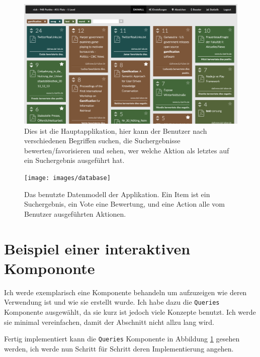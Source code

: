 \documentclass[12pt,twoside]{book}
\begin{document}
\begin{figure}[htbp]
    \centering
    \includegraphics[width=1.0\textwidth]{images/infoboard_wall.png}
    \caption{Dies ist die Hauptapplikation, hier kann der Benutzer nach verschiedenen Begriffen suchen, die Suchergebnisse bewerten/favorisieren und sehen, wer welche Aktion als letztes auf ein Suchergebnis ausgeführt hat.}\label{fig:wall}
\end{figure}


\begin{figure}[htbp]
	\centering
	\texttt{[image: images/database]}
	\caption{Das benutzte Datenmodell der Applikation. Ein Item ist ein Suchergebnis, ein Vote eine Bewertung, und eine Action alle vom Benutzer ausgeführten Aktionen.}
	\label{fig:database}
\end{figure}

\section*{Beispiel einer interaktiven Kompononte}\label{chap:appendix:component}

Ich werde exemplarisch eine Komponente behandeln um aufzuzeigen wie deren Verwendung ist und wie sie erstellt wurde. Ich habe dazu die \texttt{Queries} Komponente ausgewählt, da sie kurz ist jedoch viele Konzepte benutzt. Ich werde sie minimal vereinfachen, damit der Abschnitt nicht allzu lang wird.

Fertig implementiert kann die \texttt{Queries} Komponente in Abbildung \ref{fig:wall} gesehen werden, ich werde nun Schritt für Schritt deren Implementierung angehen.
\end{document}
